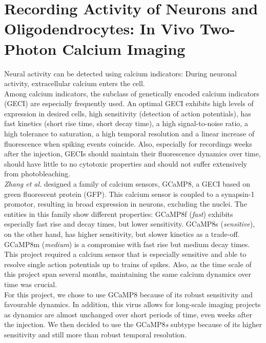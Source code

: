 \section{Recording Activity of Neurons and Oligodendrocytes: In Vivo Two-Photon Calcium Imaging}
Neural activity can be detected using calcium indicators: During neuronal activity, extracellular calcium enters the cell.\\
Among calcium indicators, the subclass of genetically encoded calcium indicators (GECI) are especially frequently used. An optimal GECI exhibits high levels of expression in desired cells, high sensitivity (detection of action potentials), has fast kinetics (short rise time, short decay time), a high signal-to-noise ratio, a high tolerance to saturation, a high temporal resolution and a linear increase of fluorescence when spiking events coincide. Also, especially for recordings weeks after the injection, GECIs should maintain their fluorescence dynamics over time, should have little to no cytotoxic properties and should not suffer extensively from photobleaching. \cite{Zhang2023} \\
\textit{Zhang et al.} designed a family of calcium sensors, GCaMP8, a GECI based on green fluorescent protein (GFP). This calcium sensor is coupled to a synapsin-1 promotor, resulting in broad expression in neurons, excluding the nuclei. The entities in this family show different properties: GCaMP8f (\textit{fast}) exhibits especially fast rise and decay times, but lower sensitivity. GCaMP8s (\textit{sensitive}), on the other hand, has higher sensitivity, but slower kinetics as a trade-off. GCaMP8m (\textit{medium}) is a compromise with fast rise but medium decay times. \cite{Zhang2023} \\
This project required a calcium sensor that is especially sensitive and able to resolve single action potentials up to trains of spikes. Also, as the time scale of this project span several months, maintaining the same calcium dynamics over time was crucial. \\
For this project, we chose to use GCaMP8 because of its robust sensitivity and favourable dynamics. In addition, this virus allows for long-scale imaging projects as dynamics are almost unchanged over short periods of time, even weeks after the injection.  \cite{Zhang2023} We then decided to use the GCaMP8\textit{s} subtype because of its higher sensitivity and still more than robust temporal resolution. 
